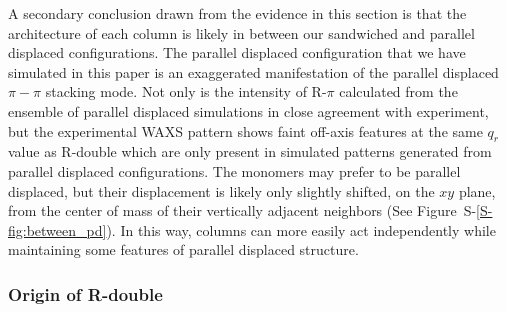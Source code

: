 \documentclass[journal=jpcbfk,manuscript=article]{achemso}
\begin{document}
  A secondary conclusion drawn from the evidence in this section is 
  that the architecture of each column is likely in between our sandwiched
  and parallel displaced configurations. The parallel displaced configuration 
  that we have simulated in this paper is an exaggerated manifestation of the 
  parallel displaced $\pi-\pi$ stacking mode. Not only is the intensity of R-$\pi$
  calculated from the ensemble of parallel displaced simulations in close agreement
  with experiment, but the experimental WAXS pattern shows faint off-axis features
  at the same $q_r$ value as R-double which are only present in simulated patterns
  generated from parallel displaced configurations. The monomers may prefer to be
  parallel displaced, but their displacement is likely only slightly shifted, on 
  the $xy$ plane, from the center of mass of their vertically adjacent neighbors 
  (See Figure~S-\ref{S-fig:between_pd}). In this way, columns can more easily act 
  independently while maintaining some features of parallel displaced structure. 


  \subsubsection{Origin of R-double}\label{section:rdouble}
  
\end{document}

